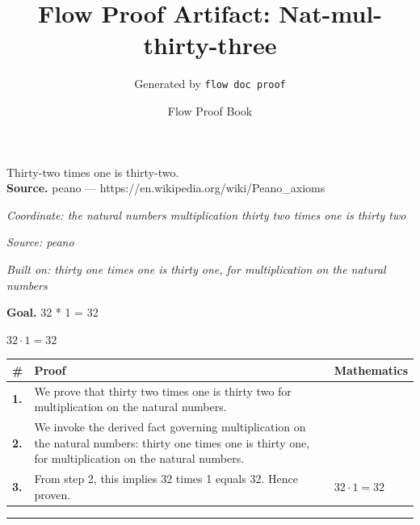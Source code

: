 \documentclass[11pt]{article}
\title{Flow Proof Artifact: Nat-mul-thirty-three}
\author{Generated by \texttt{flow doc proof}}
\date{Flow Proof Book}
\theoremstyle{definition}
\begin{document}
\maketitle
Thirty-two times one is thirty-two.\\[0.5em]
\textbf{Source.} peano — https://en.wikipedia.org/wiki/Peano\_axioms\\[0.5em]
\bigskip
{}\par
\smallskip\noindent\textit{Coordinate: the natural numbers \cdot multiplication \cdot thirty two times one is thirty two}\par
\smallskip\noindent\textit{Source: peano}\par
\smallskip\noindent\textit{Built on: thirty one times one is thirty one, for multiplication on the natural numbers}\par
\medskip
\noindent\textbf{Goal.} 32 * 1 = 32\par
\noindent$\displaystyle 32 \cdot 1 = 32$\par
\medskip
\noindent
\begin{tabular}{@{} >{\raggedright\arraybackslash}p{} >{\raggedright\arraybackslash}p{} >{\raggedleft\arraybackslash}p{} @{}}
\textbf{\#} & \textbf{Proof} & \textbf{Mathematics} \\
\midrule
\textbf{1.} & We prove that thirty two times one is thirty two for multiplication on the natural numbers. & \\[0.45em]
\textbf{2.} & We invoke the derived fact governing multiplication on the natural numbers: thirty one times one is thirty one, for multiplication on the natural numbers. & \\[0.45em]
\textbf{3.} & From step 2, this implies 32 times 1 equals 32. Hence proven. & $\displaystyle 32 \cdot 1 = 32$ \\[0.45em]
\bottomrule
\end{tabular}
\label{thm:Nat-multiplication-thirty_two_times_one_is_thirty_two}
\par\medskip\hrule
\end{document}
